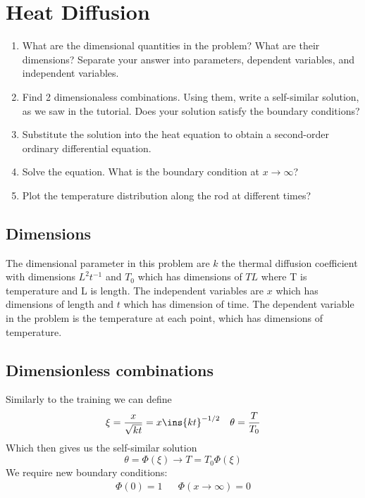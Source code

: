 \clearpage
\section{Heat Diffusion}
\begin{colbox}
	\begin{enumerate}
		\item What are the dimensional quantities in the problem? What are their dimensions? Separate your answer into parameters, dependent variables, and independent variables.
		\item Find 2 dimensionaless combinations. Using them, write a self-similar solution, as we saw in the tutorial. Does your solution satisfy the boundary conditions?
		\item Substitute the solution into the heat equation to obtain a second-order ordinary differential equation.
		\item Solve the equation. What is the boundary condition at \(x\rightarrow\infty\)?
		\item Plot the temperature distribution along the rod at different times?
	\end{enumerate}
\end{colbox}
\subsection{Dimensions}
The dimensional parameter in this problem are \(k\) the thermal diffusion coefficient with dimensions \(L^2 t^{-1}\) and \(T_0\) which has dimensions of \(TL\) where T is temperature and L is length. The independent variables are \(x\) which has dimensions of length and \(t\) which has dimension of time. The dependent variable in the problem is the temperature at each point, which has dimensions of temperature.
\subsection{Dimensionless combinations}
Similarly to the training we can define
\begin{align}
	\xi = \frac{x}{\sqrt{kt}} = x\ins{kt}^{-1/2} && \theta = \frac{T}{T_0}
\end{align}
Which then gives us the self-similar solution
\begin{equation}
	\theta = \Phi(\xi) \rightarrow T = T_0\Phi(\xi)
\end{equation}
We require new boundary conditions:
\begin{align}
	\Phi(0)=1 && \Phi(x\rightarrow\infty)=0
\end{align}
